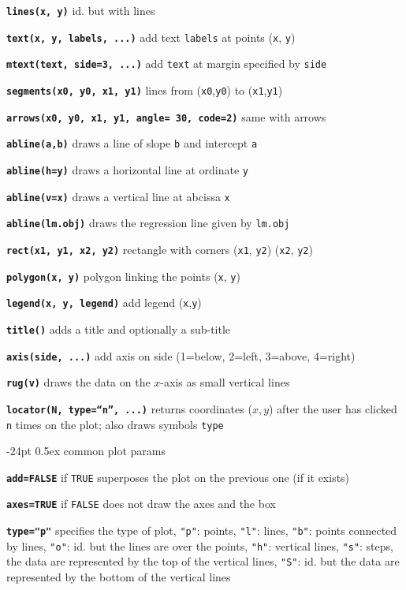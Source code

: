 \documentclass[8pt,landscape]{article}
\makeatletter
\renewcommand\section{\@startsection{section}{1}{0mm}%
                                     {-24pt}%
                                     {0.5ex}%
                                {\color{blue}\normalfont\large\bfseries}}
\newcommand{\code}{\texttt}
\newcommand{\bcode}[1]{\texttt{\textbf{#1}}}
\newcommand\F{\code{FALSE}}
\newcommand\T{\code{TRUE}}
\makeatother
\begin{document}
\begin{multicols*}{3}
\bcode{lines(x, y)}  id. but with lines

\bcode{text(x, y, labels, ...)}  add  text \code{labels} at points (\code{x}, \code{y})

\bcode{mtext(text, side=3, ...)}  add \code{text} at margin specified by \code{side}

\bcode{segments(x0, y0, x1, y1)}  lines from (\code{x0},\code{y0}) to (\code{x1},\code{y1})

\bcode{arrows(x0, y0, x1, y1, angle= 30, code=2)}  same with arrows 

\bcode{abline(a,b)}  draws a line of slope \code{b} and intercept \code{a}

\bcode{abline(h=y)}  draws a horizontal line at ordinate \code{y}

\bcode{abline(v=x)}  draws a vertical line at abcissa \code{x}

\bcode{abline(lm.obj)}  draws the regression line given by \code{lm.obj}

\bcode{rect(x1, y1, x2, y2)}  rectangle with corners (\code{x1}, \code{y2}) (\code{x2}, \code{y2})

\bcode{polygon(x, y)}  polygon linking the points (\code{x}, \code{y})

\bcode{legend(x, y, legend)}  add legend (\code{x},\code{y})

\bcode{title()}  adds a title and optionally a sub-title

\bcode{axis(side, ...)}  add axis on side (1=below, 2=left, 3=above, 4=right)

\bcode{rug(v)}  draws the data on the $x$-axis as small vertical lines

\bcode{locator(N, type=``n'', ...)}  returns coordinates ($x,y$) after the user has clicked \code{n} times on the plot; also draws symbols \code{type}



\section{common plot params}

\bcode{add=FALSE}  if \T{} superposes the plot on the previous one (if it exists)

\bcode{axes=TRUE}  if \F{} does not draw the axes and the box

\bcode{type="p"}  specifies the type of plot, \code{"p"}: points, \code{"l"}: lines, \code{"b"}: points connected by lines, \code{"o"}: id. but the lines are over the points, \code{"h"}: vertical lines, \code{"s"}: steps, the data are represented by the top of the vertical lines, \code{"S"}: id. but the data are represented by the bottom of the vertical lines


\end{multicols*}
\end{document}
